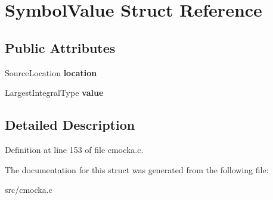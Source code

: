 \hypertarget{structSymbolValue}{}\section{Symbol\+Value Struct Reference}
\label{structSymbolValue}
\subsection*{Public Attributes}
\begin{DoxyCompactItemize}
\item 
\mbox{\label{structSymbolValue_a9d841d4c3b663a12c9bf0056d6664b41}} 
Source\+Location {\bfseries location}
\item 
\mbox{\label{structSymbolValue_aaa77effaf2204ad1b18f6a2379590750}} 
Largest\+Integral\+Type {\bfseries value}
\end{DoxyCompactItemize}


\subsection{Detailed Description}


Definition at line 153 of file cmocka.\+c.



The documentation for this struct was generated from the following file\+:\begin{DoxyCompactItemize}
\item 
src/cmocka.\+c\end{DoxyCompactItemize}
